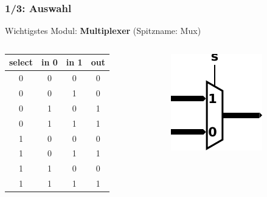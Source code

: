 \documentclass[t,aspectratio=169]{beamer}
\begin{document}
\begin{frame}
  \frametitle{1/3: Auswahl}

  Wichtigstes Modul: \textbf{Multiplexer} (Spitzname: Mux)

  \begin{columns}
    \begin{column}{.45\textwidth}
      \begin{center}
        \begin{tabular}{cccc}
          \toprule
          select & in 0 & in 1 & out \\
          \midrule
          0 & 0 & 0 & 0 \\
          0 & 0 & 1 & 0 \\
          0 & 1 & 0 & 1 \\
          0 & 1 & 1 & 1 \\
          1 & 0 & 0 & 0 \\
          1 & 0 & 1 & 1 \\
          1 & 1 & 0 & 0 \\
          1 & 1 & 1 & 1 \\
          \bottomrule
        \end{tabular}
      \end{center}
    \end{column}
    \begin{column}{.45\textwidth}
      \begin{center}
        \includegraphics[width=.66\textwidth]{multiplexer.pdf}
      \end{center}
    \end{column}
  \end{columns}
\end{frame}
\end{document}
